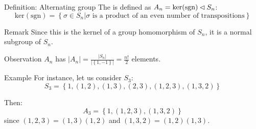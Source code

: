 \documentclass[a4paper]{article}
\begin{document}
\begin{parag}{Definition: Alternating group}
    The  is defined as $A_n = \text{ker}\left(\text{sgn}\right) \normalsubgroup S_n$: 
    \[\text{ker}\left(\text{sgn}\right) = \left\{\sigma \in S_n | \sigma \text{ is a product of an even number of transpositions}\right\}\]
    
    \begin{subparag}{Remark}
        Since this is the kernel of a group homomorphism of $S_n$, it is a normal subgroup of $S_n$.
    \end{subparag}
    
    \begin{subparag}{Observation}
        $A_n$ has $\left|A_n\right| = \frac{\left|S_n\right|}{\left|\left\{1, -1\right\}\right|} = \frac{n!}{2}$ elements.
    \end{subparag}

    \begin{subparag}{Example}
        For instance, let us consider $S_3$: 
        \[S_3 = \left\{1, \left(1, 2\right), \left(1, 3\right), \left(2, 3\right), \left(1, 2, 3\right), \left(1, 3, 2\right)\right\}\]
        
        Then: 
        \[A_3 = \left\{1, \left(1,2,3\right), \left(1, 3, 2\right)\right\}\]
        since $\left(1, 2, 3\right) = \left(1, 3\right)\left(1, 2\right)$ and $\left(1, 3, 2\right) = \left(1, 2\right)\left(1, 3\right)$.
    \end{subparag}
\end{parag}
\end{document}
